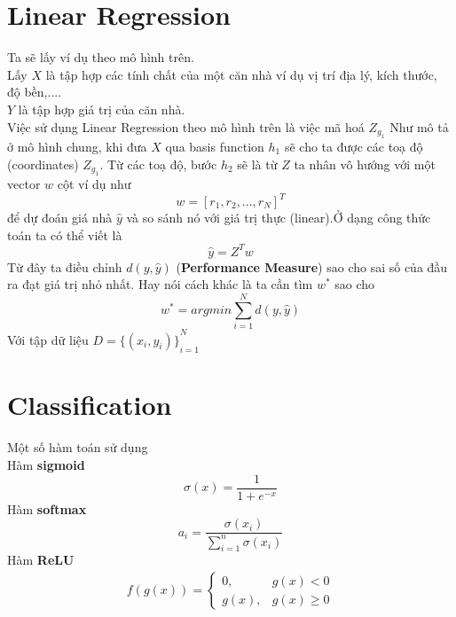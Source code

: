 \documentclass[12pt]{article}
\newcommand{\<}{\langle}
\renewcommand{\>}{\rangle}
\theoremstyle{definition}
\begin{document}
\section{Linear Regression}
Ta sẽ lấy ví dụ theo mô hình trên. \\
Lấy $X$ là tập hợp các tính chất của một căn nhà ví dụ vị trí địa lý, kích thước, độ bền,....\\
$Y$ là tập hợp giá trị của căn nhà.\\
Việc sử dụng Linear Regression theo mô hình trên là việc mã hoá $Z_{g_{1}}$
Như mô tả ở mô hình chung, khi đưa $X$ qua basis function $h_1$ sẽ cho ta được các toạ độ (coordinates) $Z_{g}_{1}$. Từ các toạ độ, bước $h_2$ sẽ là từ $Z$ ta nhân vô hướng với một vector $w$ cột ví dụ như $$w=[r_1,r_2,...,r_N]^T$$ để dự đoán giá nhà $\widehat{y}$  và so sánh nó với giá trị thực (linear).Ở dạng công thức toán ta có thể viết là
$$\widehat{y}=Z^{T}w $$
Từ đây ta điều chỉnh $d(y,\widehat{y})$
(\textbf{Performance Measure}) sao cho sai số của đầu ra đạt giá trị nhỏ nhất. Hay nói cách khác là ta cần tìm $w^*$ sao cho
$$w^*=argmin \sum_{i=1}^{N}d(y,\widehat{y})$$
Với tập dữ liệu $D={\{(x_i,y_i)\}}_{i=1}^{N}$

\section{Classification}
Một số hàm toán sử dụng \\
Hàm \textbf{sigmoid} $$\sigma(x)=\dfrac{1}{1+e^{-x}}$$
Hàm \textbf{softmax} $$a_i=\dfrac{\sigma(x_i)}{\sum_{i=1}^{n}\sigma(x_i)}$$
Hàm \textbf{ReLU} 
\begin{align*}
    f(g(x))=
    \begin{cases}
        0 , &g(x)<0\\
        g(x) , &g(x) \ge 0
    \end{cases}
\end{align*}
\end{document}
